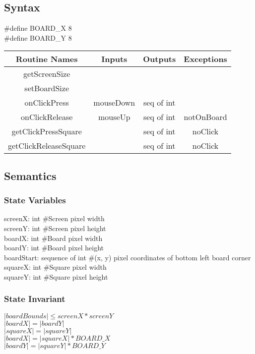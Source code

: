 \documentclass[12pt, titlepage]{article}
\begin{document}
    \subsection*{Syntax}
        \#define BOARD\_X 8\\
        \#define BOARD\_Y 8
        
        \begin{center}
            \begin{tabular}{|c|c|c|c|} 
                \hline
                Routine Names & Inputs & Outputs & Exceptions \\
                \hline
                getScreenSize & & & \\
                \hline
                setBoardSize & & & \\ 
                \hline
                onClickPress & mouseDown & seq of int & \\ 
                \hline
                onClickRelease & mouseUp & seq of int & notOnBoard \\
                \hline
                getClickPressSquare & & seq of int & noClick\\
                \hline
                getClickReleaseSquare & & seq of int & noClick\\
                \hline
            \end{tabular}
        \end{center}
    
    \subsection*{Semantics}
        \subsubsection*{State Variables}
            screenX: int \#Screen pixel width\\
            screenY: int \#Screen pixel height\\
            boardX: int \#Board pixel width\\
            boardY: int \#Board pixel height\\
            boardStart: sequence of int \#(x, y) pixel coordinates of bottom left board corner\\
            squareX: int \#Square pixel width\\
            squareY: int \#Square pixel height
            
        \subsubsection*{State Invariant}
            $|boardBounds| \leq screenX*screenY$ \\
            $|boardX| = |boardY|$ \\
            $|squareX| = |squareY|$ \\
            $|boardX| = |squareX| * BOARD\_X$ \\
            $|boardY| = |squareY| * BOARD\_Y$ \\
            
\end{document}
